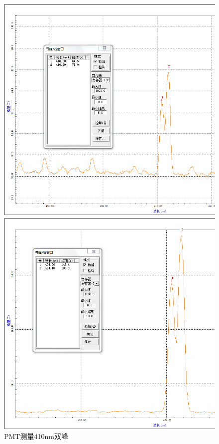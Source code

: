 \documentclass[12pt,a4paper]{article}
\begin{document}
\begin{figure}[htbp]
	\centering
	\begin{minipage}{0.49\linewidth}
		\centering
		\includegraphics[width=0.9\linewidth]{HD_408_412.png}
		\caption{PMT测量410nm双峰}
		\label{fig3}
	\end{minipage}
	\begin{minipage}{0.49\linewidth}
		\centering
		\includegraphics[width=0.9\linewidth]{HD_433_435.png}

\end{minipage}
\end{figure}
\end{document}

